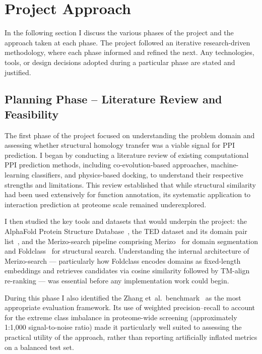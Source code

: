 \section{Project Approach}
\label{sec:intro-approach}

In the following section I discuss the various phases of the project and the approach taken at each phase.
The project followed an iterative research-driven methodology, where each phase informed and refined the next.
Any technologies, tools, or design decisions adopted during a particular phase are stated and justified.

\subsection{Planning Phase -- Literature Review and Feasibility}

The first phase of the project focused on understanding the problem domain and assessing whether structural homology transfer was a viable signal for PPI prediction.
I began by conducting a literature review of existing computational PPI prediction methods, including co-evolution-based approaches, machine-learning classifiers, and physics-based docking, to understand their respective strengths and limitations.
This review established that while structural similarity had been used extensively for function annotation, its systematic application to interaction prediction at proteome scale remained underexplored.

I then studied the key tools and datasets that would underpin the project: the AlphaFold Protein Structure Database~\cite{alphafold2}, the TED dataset and its domain pair list~\cite{ted_dataset}, and the Merizo-search pipeline comprising Merizo~\cite{merizo} for domain segmentation and Foldclass~\cite{merizo_search} for structural search.
Understanding the internal architecture of Merizo-search --- particularly how Foldclass encodes domains as fixed-length embeddings and retrieves candidates via cosine similarity followed by TM-align~\cite{tmalign} re-ranking --- was essential before any implementation work could begin.

During this phase I also identified the Zhang et~al.\ benchmark~\cite{zhang2025ppi} as the most appropriate evaluation framework.
Its use of weighted precision--recall to account for the extreme class imbalance in proteome-wide screening (approximately 1:1{,}000 signal-to-noise ratio) made it particularly well suited to assessing the practical utility of the approach, rather than reporting artificially inflated metrics on a balanced test set.

